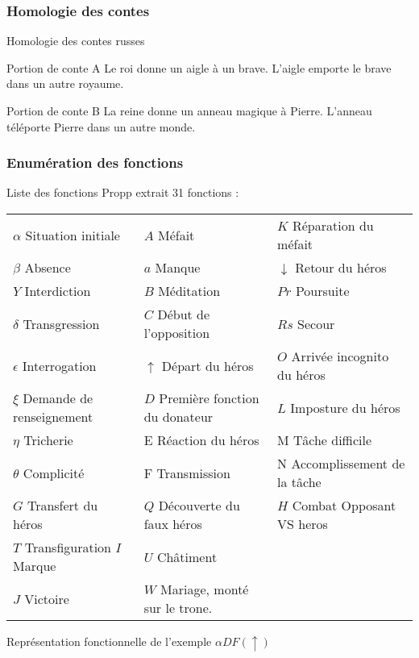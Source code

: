 \documentclass{beamer}
\begin{document}
\subsubsection{Homologie des contes}
\begin{frame}{Homologie des contes russes}
  \begin{block}{Portion de conte A}
   Le roi donne un aigle à un brave. L'aigle emporte le brave dans un autre royaume.
  \end{block}
  \begin{block}{Portion de conte B}
    La reine donne un anneau magique à Pierre. L'anneau téléporte Pierre dans un autre monde.
  \end{block}
\end{frame}

\subsubsection{Enumération des fonctions}
\begin{frame}{Liste des fonctions}
  Propp extrait 31 fonctions : 
  \newline
  \newline
  \tiny
  \begin{tabular}{ l l l }
  $\alpha$ Situation initiale & $A$ Méfait & $K$ Réparation du méfait \\
  $\beta$ Absence & $a$ Manque & $\downarrow$ Retour du héros \\
  $Y$ Interdiction & $B$ Méditation & $Pr$ Poursuite \\
  $\delta$ Transgression  & $C$ Début de l'opposition & $Rs$ Secour \\
  $\epsilon$ Interrogation & $\uparrow$ Départ du héros & $O$ Arrivée incognito du héros \\
  $\xi$ Demande de renseignement & $D$ Première fonction du donateur & $L$ Imposture du héros \\
  $\eta$ Tricherie & E Réaction du héros & M Tâche difficile \\
  $\theta$ Complicité & F Transmission & N Accomplissement de la tâche \\
  $G$ Transfert du héros & $Q$ Découverte du faux héros & $H$ Combat Opposant VS heros \\
  $T$ Transfiguration $I$ Marque & $U$ Châtiment \\
  $J$ Victoire & $W$ Mariage, monté sur le trone.\\
 \end{tabular}
 \normalsize
 \begin{block}{Représentation fonctionnelle de l'exemple}
   $\alpha D F (\uparrow)$
 \end{block}
\end{frame}
\end{document}

